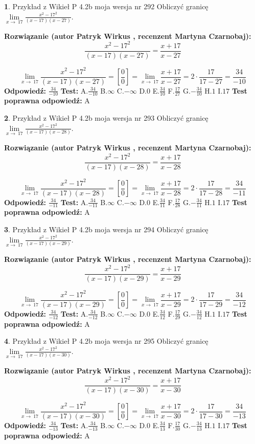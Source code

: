 \documentclass[12pt, a4paper]{article}
\theoremstyle{definition} %
\newtheorem{zad}{}
\newcommand{\zadStart}[1]{\begin{zad}#1\newline}
\newcommand{\zadStop}{\end{zad}}
\newcommand{\rozwStart}[2]{\noindent \textbf{Rozwiązanie (autor #1 , recenzent #2): }\newline}
\newcommand{\rozwStop}{\newline}
\newcommand{\odpStart}{\noindent \textbf{Odpowiedź:}\newline}
\newcommand{\odpStop}{\newline}
\newcommand{\testStart}{\noindent \textbf{Test:}\newline}
\newcommand{\testStop}{\newline}
\newcommand{\kluczStart}{\noindent \textbf{Test poprawna odpowiedź:}\newline}
\newcommand{\kluczStop}{\newline}
\begin{document}
\zadStart{Przykład z Wikieł P 4.2b moja wersja nr 292}
Obliczyć granicę $\lim\limits_{x\to\ 17}\frac{x^{2}-17^{2}}{(x-17)(x-27)}$.
\zadStop
\rozwStart{Patryk Wirkus}{Martyna Czarnobaj}
$$\frac{x^{2}-17^{2}}{(x-17)(x-27)}=\frac{x+17}{x-27}$$

$$\lim\limits_{x\to\ 17}\frac{x^{2}-17^{2}}{(x-17)(x-27)}=[\frac{0}{0}]=\lim\limits_{x\to\ 17}\frac{x+17}{x-27}=2 \cdot \frac{17}{17-27} = \frac{34}{-10}$$
\rozwStop
\odpStart
$\frac{34}{-10}$
\odpStop
\testStart
A.$\frac{34}{-10}$
B.$\infty$
C.$-\infty$
D.$0$
E.$\frac{34}{10}$
F.$\frac{17}{27}$
G.$-\frac{34}{10}$
H.$1$
I.$17$
\testStop
\kluczStart
A
\kluczStop



\zadStart{Przykład z Wikieł P 4.2b moja wersja nr 293}
Obliczyć granicę $\lim\limits_{x\to\ 17}\frac{x^{2}-17^{2}}{(x-17)(x-28)}$.
\zadStop
\rozwStart{Patryk Wirkus}{Martyna Czarnobaj}
$$\frac{x^{2}-17^{2}}{(x-17)(x-28)}=\frac{x+17}{x-28}$$

$$\lim\limits_{x\to\ 17}\frac{x^{2}-17^{2}}{(x-17)(x-28)}=[\frac{0}{0}]=\lim\limits_{x\to\ 17}\frac{x+17}{x-28}=2 \cdot \frac{17}{17-28} = \frac{34}{-11}$$
\rozwStop
\odpStart
$\frac{34}{-11}$
\odpStop
\testStart
A.$\frac{34}{-11}$
B.$\infty$
C.$-\infty$
D.$0$
E.$\frac{34}{11}$
F.$\frac{17}{28}$
G.$-\frac{34}{11}$
H.$1$
I.$17$
\testStop
\kluczStart
A
\kluczStop



\zadStart{Przykład z Wikieł P 4.2b moja wersja nr 294}
Obliczyć granicę $\lim\limits_{x\to\ 17}\frac{x^{2}-17^{2}}{(x-17)(x-29)}$.
\zadStop
\rozwStart{Patryk Wirkus}{Martyna Czarnobaj}
$$\frac{x^{2}-17^{2}}{(x-17)(x-29)}=\frac{x+17}{x-29}$$

$$\lim\limits_{x\to\ 17}\frac{x^{2}-17^{2}}{(x-17)(x-29)}=[\frac{0}{0}]=\lim\limits_{x\to\ 17}\frac{x+17}{x-29}=2 \cdot \frac{17}{17-29} = \frac{34}{-12}$$
\rozwStop
\odpStart
$\frac{34}{-12}$
\odpStop
\testStart
A.$\frac{34}{-12}$
B.$\infty$
C.$-\infty$
D.$0$
E.$\frac{34}{12}$
F.$\frac{17}{29}$
G.$-\frac{34}{12}$
H.$1$
I.$17$
\testStop
\kluczStart
A
\kluczStop



\zadStart{Przykład z Wikieł P 4.2b moja wersja nr 295}
Obliczyć granicę $\lim\limits_{x\to\ 17}\frac{x^{2}-17^{2}}{(x-17)(x-30)}$.
\zadStop
\rozwStart{Patryk Wirkus}{Martyna Czarnobaj}
$$\frac{x^{2}-17^{2}}{(x-17)(x-30)}=\frac{x+17}{x-30}$$

$$\lim\limits_{x\to\ 17}\frac{x^{2}-17^{2}}{(x-17)(x-30)}=[\frac{0}{0}]=\lim\limits_{x\to\ 17}\frac{x+17}{x-30}=2 \cdot \frac{17}{17-30} = \frac{34}{-13}$$
\rozwStop
\odpStart
$\frac{34}{-13}$
\odpStop
\testStart
A.$\frac{34}{-13}$
B.$\infty$
C.$-\infty$
D.$0$
E.$\frac{34}{13}$
F.$\frac{17}{30}$
G.$-\frac{34}{13}$
H.$1$
I.$17$
\testStop
\kluczStart
A
\kluczStop
\end{document}
